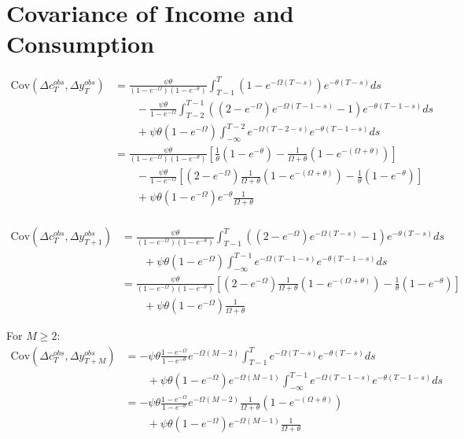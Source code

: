 \documentclass[12pt,pdftex,letterpaper]{article}
\begin{document}
\section{Covariance of Income and Consumption}
\begin{align*}
\mathrm{Cov}(\Delta c_T^{obs},\Delta y_{T}^{obs}) 
&=\frac{\psi \theta}{(1-e^{-\Omega})(1-e^{-\theta})}\int_{T-1}^{T}  ( 1 - e^{-\Omega (T-s)} ) e^{-\theta (T-s)}ds \\
& \qquad  - \frac{\psi \theta}{1-e^{-\Omega}} \int_{T-2}^{T-1}\left( (2-e^{-\Omega}) e^{-\Omega (T-1-s)} -1  \right)  e^{-\theta (T-1-s)}ds \\
& \qquad + \psi \theta (1-e^{-\Omega}) \int_{-\infty}^{T-2}  e^{-\Omega (T-2-s)}  e^{-\theta (T-1-s)}ds \\
&=\frac{\psi \theta}{(1-e^{-\Omega})(1-e^{-\theta})} \left[ \frac{1}{\theta}(1-e^{-\theta}) - \frac{1}{\Omega + \theta}(1-e^{-(\Omega+\theta)})  \right] \\
& \qquad  - \frac{\psi \theta}{1-e^{-\Omega}} \left[ (2-e^{-\Omega}) \frac{1}{\Omega + \theta}(1-e^{-(\Omega+\theta)}) - \frac{1}{\theta}(1-e^{-\theta})  \right] \\
& \qquad + \psi \theta (1-e^{-\Omega}) e^{-\theta} \frac{1}{\Omega + \theta} \\
\end{align*}

\begin{align*}
\mathrm{Cov}(\Delta c_{T}^{obs},\Delta y_{T+1}^{obs}) 
&= \frac{\psi \theta}{(1-e^{-\Omega})(1-e^{-\theta})} \int_{T-1}^{T}\left( (2-e^{-\Omega}) e^{-\Omega (T-s)} -1  \right) e^{-\theta (T-s)}ds \\
& \qquad +\psi \theta  (1-e^{-\Omega}) \int_{-\infty}^{T-1}  e^{-\Omega (T-1-s)} e^{-\theta (T-1-s)}ds \\
&= \frac{\psi \theta}{(1-e^{-\Omega})(1-e^{-\theta})} \left[ (2-e^{-\Omega})\frac{1}{\Omega + \theta}(1-e^{-(\Omega+\theta)}) - \frac{1}{\theta}(1-e^{-\theta})  \right] \\
& \qquad +\psi \theta  (1-e^{-\Omega}) \frac{1}{\Omega + \theta}
\end{align*}

For $M \geq 2$:
\begin{align*}
\mathrm{Cov}(\Delta c_T^{obs},\Delta y_{T+M}^{obs}) 
&= -\psi \theta\frac{1-e^{-\Omega}}{1-e^{-\theta}} e^{-\Omega (M-2)}\int_{T-1}^{T}  e^{-\Omega (T-s)} e^{-\theta (T-s)}ds \\
& \qquad + \psi \theta (1-e^{-\Omega})e^{-\Omega(M-1)} \int_{-\infty}^{T-1}  e^{-\Omega (T-1-s)} e^{-\theta (T-1-s)}ds \\
&= -\psi \theta\frac{1-e^{-\Omega}}{1-e^{-\theta}} e^{-\Omega (M-2)}\frac{1}{\Omega + \theta}(1-e^{-(\Omega+\theta)}) \\
& \qquad + \psi \theta (1-e^{-\Omega})e^{-\Omega(M-1)} \frac{1}{\Omega + \theta}
\end{align*}
\end{document}
